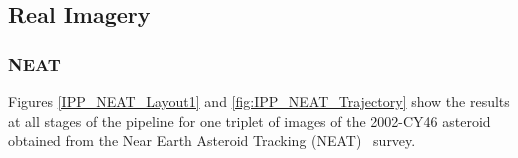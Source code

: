 \subsection{Real Imagery}
\label{ssec:real}

\subsubsection{NEAT}

Figures \ref{IPP_NEAT_Layout1} and \ref{fig:IPP_NEAT_Trajectory} show the results at all stages of the pipeline for one triplet of images of the 2002-CY46 asteroid obtained from the Near Earth Asteroid Tracking (NEAT)~\cite{neat2014} survey. 
 

